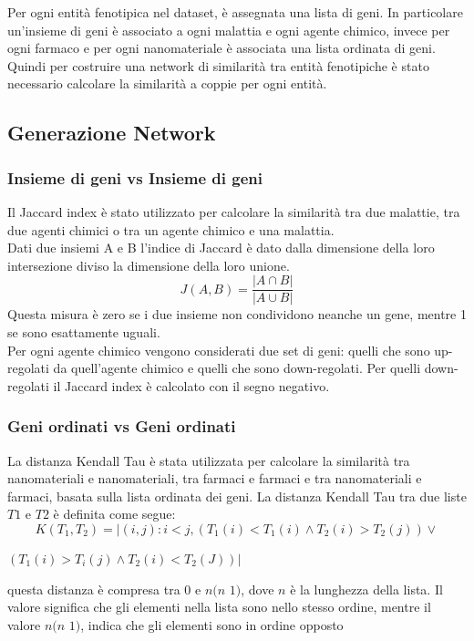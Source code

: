 \documentclass{beamer}
\begin{document}
\begin{frame}
Per ogni entità fenotipica nel dataset, è assegnata una lista di geni. In particolare un'insieme di geni è associato a ogni malattia e ogni agente chimico, invece per ogni farmaco e per ogni nanomateriale è associata una lista ordinata di geni. \\
\medskip
Quindi per costruire una network di similarità tra entità fenotipiche è stato necessario calcolare la similarità a coppie per ogni entità.
\end{frame}

\subsection{Generazione Network}
\begin{frame}
\frametitle{Insieme di geni vs Insieme di geni}
Il Jaccard index è stato utilizzato per calcolare la similarità tra due malattie, tra due agenti chimici o tra un agente chimico e una malattia.\\
Dati due insiemi A e B l'indice di Jaccard è dato dalla dimensione della loro intersezione diviso la dimensione della loro unione.
\begin{equation}
J(A, B) = \frac{|A \cap B|}{|A \cup  B|}
\end{equation}
Questa misura è zero se i due insieme non condividono neanche un gene, mentre 1 se sono esattamente uguali.\\
Per ogni agente chimico vengono considerati due set di geni: quelli che sono up-regolati da quell'agente chimico e quelli che sono down-regolati.
Per quelli down-regolati il Jaccard index è calcolato con il segno negativo.
\end{frame}


\begin{frame}
\frametitle{Geni ordinati vs Geni ordinati}
La distanza Kendall Tau è stata utilizzata per calcolare la similarità tra nanomateriali e nanomateriali, tra farmaci e farmaci e tra nanomateriali e farmaci, basata sulla lista ordinata dei geni.
La distanza Kendall Tau tra due liste $T1$ e $T2$ è definita come segue:
\begin{equation}
K(T_1, T_2) = |(i, j): i < j, (T_1(i) < T_1(i) \wedge  T_2(i) > T_2(j)) \vee
\end{equation}
\begin{center}$
 (T_1(i) > T_i(j) \wedge T_2(i) < T_2(J))  |
$
\end{center}
questa distanza è compresa tra 0 e $n(n$ $1)$, dove $n$ è la lunghezza della lista. Il valore significa che gli elementi nella lista sono nello stesso ordine, mentre il valore $n(n$ $1)$, indica che gli elementi sono in ordine opposto
\end{frame}
\end{document}
